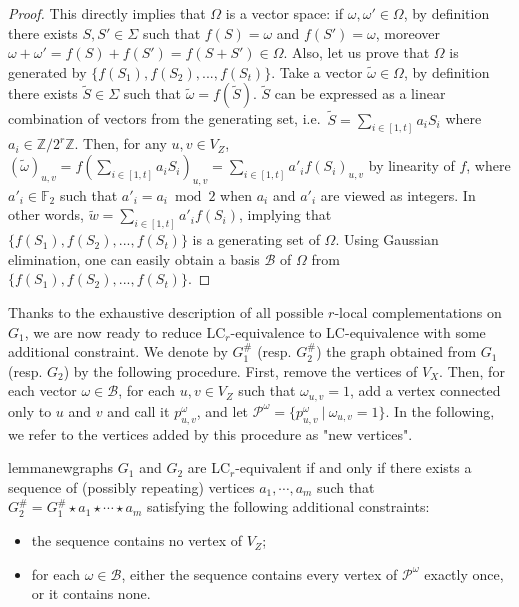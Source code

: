\documentclass[a4paper,UKenglish,cleveref,autoref,thm-restate]{arxiv}
\newcommand{\Zp}[1]{\mathbb{Z}/#1\mathbb{Z}}
\begin{document}
\begin{proof}
    This directly implies that $\Omega$ is a vector space: if $\omega, \omega' \in \Omega$, by definition there exists $S, S' \in \Sigma$ such that $f(S) = \omega$ and $f(S') = \omega$, moreover $\omega + \omega' = f(S) + f(S') = f(S+S') \in \Omega$. Also, let us prove that $\Omega$ is generated by $\{f(S_1),f(S_2),...,f(S_t)\}$. Take a vector $\tilde \omega \in \Omega$, by definition there exists $\tilde S \in \Sigma$ such that $\tilde \omega = f(\tilde S)$. $\tilde S$ can be expressed as a linear combination of vectors from the generating set, i.e.~$\tilde S = \sum_{i \in [1,t]}a_i S_i$ where $a_i \in \Zp{2^r}$. Then, for any $u,v \in V_Z$, $ (\tilde \omega)_{u,v} = f\left(\sum_{i \in [1,t]}a_i S_i\right)_{u,v} = \sum_{i \in [1,t]}a'_i f(S_i)_{u,v}$ by linearity of $f$, where $a'_i \in \mathbb F_2$ such that $a'_i = a_i \bmod 2$ when $a_i$ and $a'_i$ are viewed as integers. In other words, $\tilde w = \sum_{i \in [1,t]}a'_i f(S_i)$, implying that $\{f(S_1),f(S_2),...,f(S_t)\}$ is a generating set of $\Omega$. Using Gaussian elimination, one can easily obtain a basis $\mathcal B$ of $\Omega$ from $\{f(S_1),f(S_2),...,f(S_{t})\}$.


\end{proof}

Thanks to the exhaustive description of all possible $r$-local complementations on $G_1$, we are now ready to reduce LC$_r$-equivalence to LC-equivalence with some additional constraint. We denote by $G_1^{\#}$ (resp. $G_2^{\#}$) the graph obtained from $G_1$ (resp. $G_2$) by the following procedure. First, remove the vertices of $V_X$. Then, for each vector $\omega \in \mathcal B$, for each $u,v \in V_Z$ such that $\omega_{u,v} = 1$, add a vertex connected only to $u$ and $v$ and call it $p_{u,v}^{\omega}$, and let $\mathcal P^\omega= \{p_{u,v}^{\omega} ~|~ \omega_{u,v}=1\}$. In the following, we refer to the vertices added by this procedure as "new vertices". 


\begin{restatable}{lemma}{newgraphs} \label{lemma:new_graphs}
    $G_1$ and $G_2$ are LC$_r$-equivalent if and only if there exists a sequence of (possibly repeating) vertices $a_1, \cdots, a_m$ such that $G^{\#}_2 = G^{\#}_1 \star a_1 \star \cdots \star a_m$ satisfying the following additional constraints:
    \begin{itemize}
        \item the sequence contains no vertex of $V_Z$;
        \item for each $\omega \in \mathcal B$, either the sequence contains every vertex of $\mathcal P^{\omega}$ exactly once, or it contains none. 
    \end{itemize}
\end{restatable}
\end{document}
